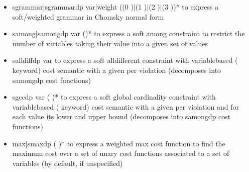 \documentclass[letterpaper,10pt,openany,oneside,english]{sphinxmanual}
\begin{document}
\begin{fulllineitems}
\begin{itemize}
\begin{itemize}
\item {} 
\sphinxAtStartPar
sgrammar|sgrammardp var|weight      ((0  )|(1   )|(2   )|(3    ))* to express a soft/weighted grammar in Chomsky normal form

\item {} 
\sphinxAtStartPar
samong|samongdp var     ()* to express a soft among constraint to restrict the number of variables taking their value into a given set of values

\item {} 
\sphinxAtStartPar
salldiffdp var  to express a soft alldifferent constraint with variable\sphinxhyphen{}based ( keyword) cost semantic with a given  per violation (decomposes into samongdp cost functions)

\item {} 
\sphinxAtStartPar
sgccdp var   (  )* to express a soft global cardinality constraint with variable\sphinxhyphen{}based ( keyword) cost semantic with a given  per violation and for each value its lower and upper bound (decomposes into samongdp cost functions)

\item {} 
\sphinxAtStartPar
max|smaxdp   (  )* to express a weighted max cost function to find the maximum cost over a set of unary cost functions associated to a set of variables (by default,  if unspecified)


\end{itemize}
\end{itemize}
\end{fulllineitems}
\end{document}
